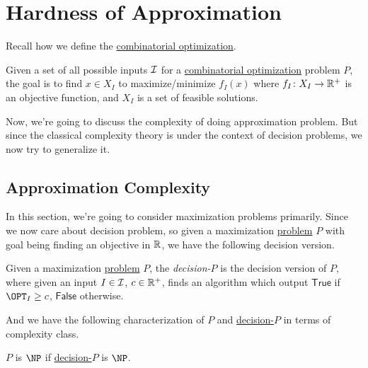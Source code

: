 \chapter{Hardness of Approximation}
Recall how we define the \hyperref[def:combinatorial-optimization]{combinatorial optimization}.

\begin{prev}
	Given a set of all possible inputs \(\mathcal{\MakeUppercase{i}} \) for a \hyperref[def:combinatorial-optimization]{combinatorial optimization} problem \(P\), the goal is to find \(x\in X_I\) to maximize/minimize \(f_I (x)\) where \(f_I \colon X_I \to \mathbb{\MakeUppercase{r}} ^+\) is an objective function, and \(X_I\) is a set of feasible solutions.
\end{prev}

Now, we're going to discuss the complexity of doing approximation problem. But since the classical complexity theory is under the context of decision problems, we now try to generalize it.

\section{Approximation Complexity}
In this section, we're going to consider maximization problems primarily. Since we now care about decision problem, so given a maximization \hyperref[def:combinatorial-optimization]{problem} \(P\) with goal being finding an objective in \(\mathbb{\MakeUppercase{r}} \), we have the following decision version.

\begin{definition}[Decision-\(P\)]\label{def:decision-P}
	Given a maximization \hyperref[def:combinatorial-optimization]{problem} \(P\), the \emph{decision-\(P\)} is the decision version of \(P\), where given an input \(I\in \mathcal{\MakeUppercase{i}} \), \(c\in \mathbb{\MakeUppercase{r}} ^+\), finds an algorithm which output \(\textsf{True}\) if \(\OPT_I \geq c\), \(\textsf{False}\) otherwise.
\end{definition}

And we have the following characterization of \(P\) and \hyperref[def:decision-P]{decision-\(P\)} in terms of complexity class.

\begin{definition}
	\(P\) is \(\NP\) if \hyperref[def:decision-P]{decision-\(P\)} is \(\NP\).
\end{definition}

